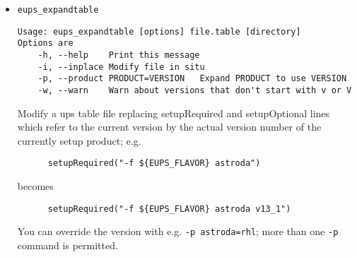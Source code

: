 \documentclass{article}
\newcommand{\code}[1]{\texttt{#1}}
\newcommand{\eups}{\code{ExtUPS}}
\newcommand{\pacman}{\code{pacman}}
\begin{document}
\begin{itemize}
When creating an distribution, tarballs that already present are not recreated
(unless you specify \code{--force}),
so repeating a \code{eups\_distrib --create} command to create a manifest for another
product won't lead to duplication of tarballs.  If you want to use \pacman{},
see App. \ref{pacman}.

When unpacking a distribution with \code{eups\_distrib --install}, products that are
already declared to \eups{} won't be unpacked and re-declared (unless you specify \code{--force}).

If you don't specify a version when installing a distribution with
\code{--install} the current version will be used.  This isn't quite the same
as the version declared current on some machine where the distribution
originated, as a bleeding-edge version acceptable in Princeton may not
be ready for deployment on a mountain top in e.g. Chile. In
consequence, the list of `current' versions is \textit{not}
automatically created or updated by \code{eups\_distrib --create}, but is
only set when you later say \code{eups\_distrib --current}.  If you don't specify
a product, the list will in fact be identical to your local preferences.
Alternatively, you can update a single product's version number (e.g.
\code{eups\_distrib --current moby}) or specify a version (\code{eups\_distrib --current moby v1\_2}).

\textit{N.b.} As presently written, \code{eups\_distrib} assumes that you've
installed all the products into \eups, as opposed to simple declaring them, but
relying on files installed in e.g. \code{/usr/local}; more precisely, it assumes
that all product directories start with a directory listed in \code{EUPS\_PATH}.
This is probably a good idea, as otherwise \code{eups\_distrib} would tar up
all of /usr/local for you.
  

  \item \code{eups\_expandtable}
\begin{verbatim}
Usage: eups_expandtable [options] file.table [directory]
Options are
    -h, --help    Print this message
    -i, --inplace Modify file in situ
    -p, --product PRODUCT=VERSION   Expand PRODUCT to use VERSION
    -w, --warn    Warn about versions that don't start with v or V
\end{verbatim}

Modify a ups table file replacing setupRequired and setupOptional
lines which refer to the current version by the actual version number
of the currently setup product; e.g.
\begin{verbatim}
      setupRequired("-f ${EUPS_FLAVOR} astroda")
\end{verbatim}
becomes
\begin{verbatim}
      setupRequired("-f ${EUPS_FLAVOR} astroda v13_1")
\end{verbatim}
You can override the version with e.g. \code{-p astroda=rhl}; more
than one \code{-p} command is permitted.


\end{itemize}
\end{document}
